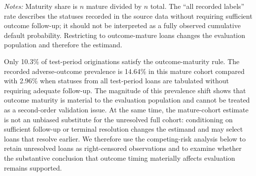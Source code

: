 \documentclass[10pt]{article}
\begin{document}
\begin{table}[!ht]
\centering
\caption{Outcome maturity and prevalence by chronological split. The all-label rate treats every recorded label as observed; the mature rate restricts evaluation to loans meeting the outcome-maturity rule.}
\label{tab:maturity}

\vspace{3pt}
{\footnotesize \textit{Notes:} Maturity share is $n$ mature divided by $n$ total. The ``all recorded labels'' rate describes the statuses recorded in the source data without requiring sufficient outcome follow-up; it should not be interpreted as a fully observed cumulative default probability. Restricting to outcome-mature loans changes the evaluation population and therefore the estimand.}
\end{table}

Only 10.3\% of test-period originations satisfy the outcome-maturity rule. The recorded adverse-outcome prevalence is 14.64\% in this mature cohort compared with 2.96\% when statuses from all test-period loans are tabulated without requiring adequate follow-up. The magnitude of this prevalence shift shows that outcome maturity is material to the evaluation population and cannot be treated as a second-order validation issue. At the same time, the mature-cohort estimate is not an unbiased substitute for the unresolved full cohort: conditioning on sufficient follow-up or terminal resolution changes the estimand and may select loans that resolve earlier. We therefore use the competing-risk analysis below to retain unresolved loans as right-censored observations and to examine whether the substantive conclusion that outcome timing materially affects evaluation remains supported.
\end{document}
